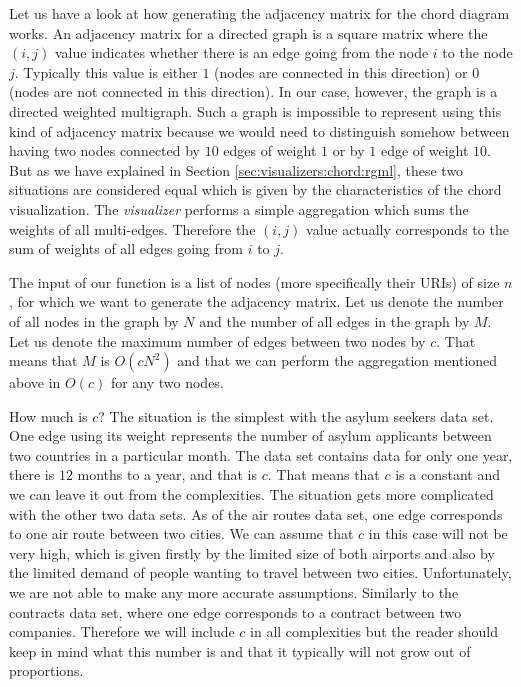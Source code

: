 Let us have a look at how generating the adjacency matrix for the chord diagram works. An adjacency matrix for a directed graph is a square matrix where the $(i, j)$ value indicates whether there is an edge going from the node $i$ to the node $j$. Typically this value is either $1$ (nodes are connected in this direction) or $0$ (nodes are not connected in this direction). In our case, however, the graph is a directed weighted multigraph. Such a graph is impossible to represent using this kind of adjacency matrix because we would need to distinguish somehow between having two nodes connected by $10$ edges of weight $1$ or by $1$ edge of weight $10$.  But as we have explained in Section \ref{sec:visualizers:chord:rgml}, these two situations are considered equal which is given by the characteristics of the chord visualization. The \emph{visualizer} performs a simple aggregation which sums the weights of all multi-edges. Therefore the $(i,j)$ value actually corresponds to the sum of weights of all edges going from $i$ to $j$.

The input of our function is a list of nodes (more specifically their URIs) of size $n$, for which we want to generate the adjacency matrix. Let us denote the number of all nodes in the graph by $N$ and the number of all edges in the graph by $M$. Let us denote the maximum number of edges between two nodes by $c$. That means that $M$ is $O(cN^2)$ and that we can perform the aggregation mentioned above in $O(c)$ for any two nodes.
%
%
%

How much is $c$?  The situation is the simplest with the asylum seekers data set. One edge using its weight represents the number of asylum applicants between two countries in a particular month. The data set contains data for only one year, there is $12$ months to a year, and that is $c$. That means that $c$ is a constant and we can leave it out from the complexities. The situation gets more complicated with the other two data sets. As of the air routes data set, one edge corresponds to one air route between two cities. We can assume that $c$ in this case will not be very high, which is given firstly by the limited size of both airports and also by the limited demand of people wanting to travel between two cities. Unfortunately, we are not able to make any more accurate assumptions. Similarly to the contracts data set, where one edge corresponds to a contract between two companies. Therefore we will include $c$ in all complexities but the reader should keep in mind what this number is and that it typically will not grow out of proportions.

